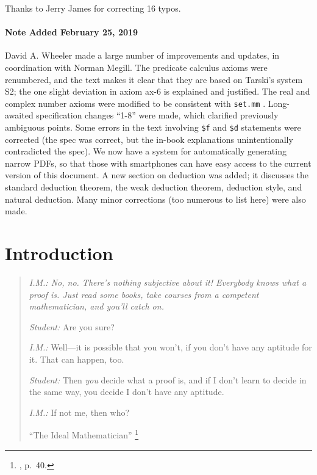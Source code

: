 Thanks to Jerry James for correcting 16 typos.

\subsubsection{Note Added February 25, 2019}\label{note2019}

David A. Wheeler
made a large number of improvements and updates,
in coordination with Norman Megill.
The predicate calculus axioms were renumbered, and the text makes
it clear that they are based on Tarski's system S2;
the one slight deviation in axiom ax-6 is explained and justified.
The real and complex number axioms were modified to be consistent with
\texttt{set.mm}%
.
Long-awaited specification changes ``1-8'' were made,
which clarified previously ambiguous points.
Some errors in the text involving \texttt{\$f} and
\texttt{\$d} statements were corrected (the spec was correct, but
the in-book explanations unintentionally contradicted the spec).
We now have a system for automatically generating narrow PDFs,
so that those with smartphones can have easy access to the current
version of this document.
A new section on deduction was added;
it discusses the standard deduction theorem,
the weak deduction theorem,
deduction style, and natural deduction.
Many minor corrections (too numerous to list here) were also made.

\chapter{Introduction}

\begin{quotation}
  {\em {\em I.M.:}  No, no.  There's nothing subjective about it!  Everybody
knows what a proof is.  Just read some books, take courses from a competent
mathematician, and you'll catch on.

{\em Student:}  Are you sure?

{\em I.M.:}  Well---it is possible that you won't, if you don't have any
aptitude for it.  That can happen, too.

{\em Student:}  Then {\em you} decide what a proof is, and if I don't learn
to decide in the same way, you decide I don't have any aptitude.

{\em I.M.:}  If not me, then who?}
    \flushright\sc  ``The Ideal Mathematician''
    \footnote{\cite{Davis}, p.~40.}\\
\end{quotation}

